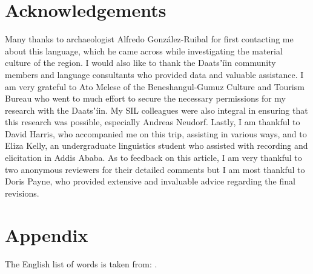 \documentclass[output=paper]{langsci/langscibook}
\begin{document}
\section*{Acknowledgements}

Many thanks to archaeologist Alfredo González-Ruibal for first contacting me about this language, which he came across while investigating the material culture of the region. I would also like to thank the Daatsʼíin community members and language consultants who provided data and valuable assistance. I am very grateful to Ato Melese of the Beneshangul-Gumuz Culture and Tourism Bureau who went to much effort to secure the necessary permissions for my research with the Daatsʼíin. My SIL colleagues were also integral in ensuring that this research was possible, especially Andreas Neudorf. Lastly, I am thankful to David Harris, who accompanied me on this trip, assisting in various ways, and to Eliza Kelly, an undergraduate linguistics student who assisted with recording and elicitation in Addis Ababa. As to feedback on this article, I am very thankful to two anonymous reviewers for their detailed comments but I am most thankful to Doris Payne, who provided extensive and invaluable advice regarding the final revisions.

\section*{Appendix}

The English list of words is taken from: \citet{HaspelmathTadmor2009}.
\end{document}
